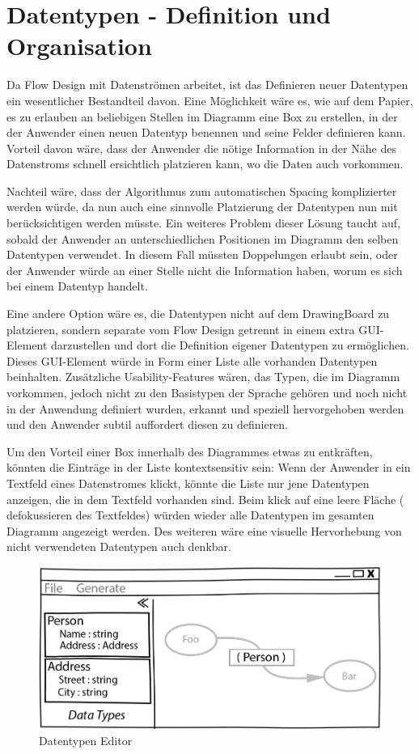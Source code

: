 \section{Datentypen - Definition und Organisation}

Da Flow Design mit Datenströmen arbeitet, ist das Definieren neuer Datentypen
ein wesentlicher Bestandteil davon.
Eine Möglichkeit wäre es, wie auf dem Papier, es zu erlauben an beliebigen
Stellen im Diagramm eine Box zu erstellen, in der der Anwender einen neuen
Datentyp benennen und seine Felder definieren kann. Vorteil davon wäre, dass der
Anwender die nötige Information in der Nähe des Datenstroms schnell ersichtlich
platzieren kann, wo die Daten auch vorkommen.

Nachteil wäre, dass der Algorithmus zum automatischen Spacing komplizierter
werden würde, da nun auch eine sinnvolle Platzierung der Datentypen nun mit
berücksichtigen werden müsste.
Ein weiteres Problem dieser Lösung taucht auf, sobald der Anwender an unterschiedlichen
Positionen im Diagramm den selben Datentypen verwendet. In diesem Fall müssten Doppelungen erlaubt
sein, oder der Anwender würde an einer Stelle nicht die Information haben, worum
es sich bei einem Datentyp handelt.

Eine andere Option wäre es, die Datentypen nicht auf dem DrawingBoard zu
platzieren, sondern separate vom Flow Design getrennt in einem extra GUI-Element
darzustellen und dort die Definition eigener Datentypen zu ermöglichen.
Dieses GUI-Element würde in Form einer Liste alle vorhanden Datentypen
beinhalten. Zusätzliche Usability-Features wären, das Typen, die im Diagramm
vorkommen, jedoch nicht zu den Basistypen der Sprache gehören und noch nicht in
der Anwendung definiert wurden, erkannt und speziell hervorgehoben werden und
den Anwender subtil auffordert diesen zu definieren.

Um den Vorteil einer Box innerhalb des Diagrammes etwas zu entkräften, könnten
die Einträge in der Liste kontextsensitiv sein: Wenn der Anwender in ein
Textfeld eines Datenstromes klickt, könnte die Liste nur jene Datentypen
anzeigen, die in dem Textfeld vorhanden sind. Beim klick auf eine leere Fläche (
defokussieren des Textfeldes) würden wieder alle Datentypen im gesamten Diagramm
angezeigt werden. Des weiteren wäre eine visuelle Hervorhebung von nicht
verwendeten Datentypen auch denkbar.
\bigskip

\begin{figure}[H]
	\centering
	\includegraphics[width=.9\linewidth]{./img/DatatypesCrop.jpg}
	\caption{Datentypen Editor}
\end{figure}




